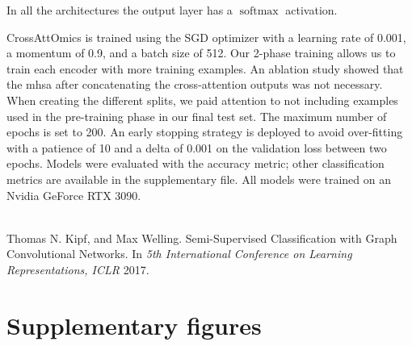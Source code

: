      In all the architectures the output layer has a \(\operatorname{softmax}\) activation.

     CrossAttOmics is trained using the SGD optimizer with a learning rate of 0.001, a momentum of 0.9, and a batch size of 512.
     Our 2-phase training allows us to train each encoder with more training examples.
     An ablation study showed that the \gls{mhsa} after concatenating the cross-attention outputs was not necessary.
     When creating the different splits, we paid attention to not including examples used in the pre-training phase in our final test set.
     The maximum number of epochs is set to 200.
     An early stopping strategy is deployed to avoid over-fitting with a patience of 10 and a delta of 0.001 on the validation loss between two epochs.
     Models were evaluated with the accuracy metric; other classification metrics are available in the supplementary file.
     All models were trained on an Nvidia GeForce RTX 3090.

     ~\\
     Thomas N. Kipf, and Max Welling. Semi-Supervised Classification with Graph Convolutional Networks. In \textit{5th International Conference on Learning Representations, ICLR} 2017.

     \newpage
\section{Supplementary figures}

